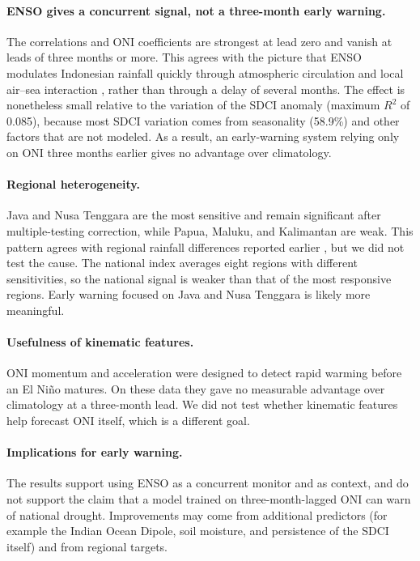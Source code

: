 \documentclass[11pt,twoside]{article}
\begin{document}
\paragraph{ENSO gives a concurrent signal, not a three-month early warning.} The correlations and ONI coefficients are strongest at lead zero and vanish at leads of three months or more. This agrees with the picture that ENSO modulates Indonesian rainfall quickly through atmospheric circulation and local air--sea interaction \cite{hendon2003indonesian,aldrian2003rainfall}, rather than through a delay of several months. The effect is nonetheless small relative to the variation of the SDCI anomaly (maximum $R^2$ of 0.085), because most SDCI variation comes from seasonality (58.9\%) and other factors that are not modeled. As a result, an early-warning system relying only on ONI three months earlier gives no advantage over climatology.

\paragraph{Regional heterogeneity.} Java and Nusa Tenggara are the most sensitive and remain significant after multiple-testing correction, while Papua, Maluku, and Kalimantan are weak. This pattern agrees with regional rainfall differences reported earlier \cite{aldrian2003rainfall,hamada2002rainy}, but we did not test the cause. The national index averages eight regions with different sensitivities, so the national signal is weaker than that of the most responsive regions. Early warning focused on Java and Nusa Tenggara is likely more meaningful.

\paragraph{Usefulness of kinematic features.} ONI momentum and acceleration were designed to detect rapid warming before an El Ni\~no matures. On these data they gave no measurable advantage over climatology at a three-month lead. We did not test whether kinematic features help forecast ONI itself, which is a different goal.

\paragraph{Implications for early warning.} The results support using ENSO as a concurrent monitor and as context, and do not support the claim that a model trained on three-month-lagged ONI can warn of national drought. Improvements may come from additional predictors (for example the Indian Ocean Dipole, soil moisture, and persistence of the SDCI itself) and from regional targets.
\end{document}
